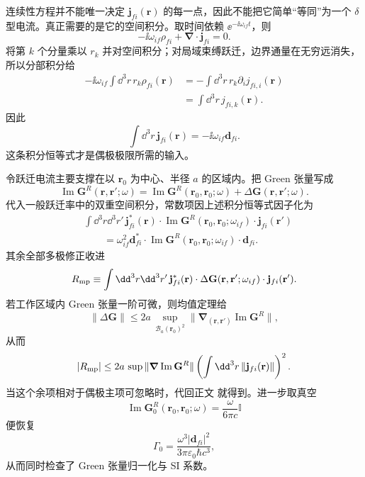 \begin{derivation}
连续性方程并不能唯一决定 $\mathbf j_{fi}(\mathbf r)$ 的每一点，因此不能把它简单“等同”为一个 $\delta$ 型电流。真正需要的是它的空间积分。取时间依赖 $\ee^{-\ii\omega_{if}t}$，则
\[
-\ii\omega_{if}\rho_{fi}
+\boldsymbol\nabla\cdot\mathbf j_{fi}=0.
\]
将第 $k$ 个分量乘以 $r_k$ 并对空间积分；对局域束缚跃迁，边界通量在无穷远消失，所以分部积分给
\begin{align*}
-\ii\omega_{if}
\int\dd^3r\,r_k\rho_{fi}(\mathbf r)
&=-\int\dd^3r\,r_k\partial_i j_{fi,i}(\mathbf r)\\
&=\int\dd^3r\,j_{fi,k}(\mathbf r).
\end{align*}
因此
\[
\boxed{
\int\dd^3r\,\mathbf j_{fi}(\mathbf r)
=-\ii\omega_{if}\mathbf d_{fi}.}
\]
这条积分恒等式才是偶极极限所需的输入。

令跃迁电流主要支撑在以 $\mathbf r_0$ 为中心、半径 $a$ 的区域内。把 Green 张量写成
\[
\operatorname{Im}\mathbf G^R(\mathbf r,\mathbf r';\omega)
=\operatorname{Im}\mathbf G^R(\mathbf r_0,\mathbf r_0;\omega)
+\Delta\mathbf G(\mathbf r,\mathbf r';\omega).
\]
代入一般跃迁率中的双重空间积分，常数项因上述积分恒等式因子化为
\begin{align*}
&\int\dd^3r\dd^3r'\,
\mathbf j_{fi}^*(\mathbf r)\cdot
\operatorname{Im}\mathbf G^R(\mathbf r_0,\mathbf r_0;\omega_{if})
\cdot\mathbf j_{fi}(\mathbf r')\\
&\qquad=\omega_{if}^2
\mathbf d_{fi}^*\cdot
\operatorname{Im}\mathbf G^R(\mathbf r_0,\mathbf r_0;\omega_{if})
\cdot\mathbf d_{fi}.
\end{align*}
其余全部多极修正收进
\[
R_{\rm mp}
\equiv
\int\dd^3r\dd^3r'\,
\mathbf j_{fi}^*(\mathbf r)\cdot
\Delta\mathbf G(\mathbf r,\mathbf r';\omega_{if})
\cdot\mathbf j_{fi}(\mathbf r').
\]
若工作区域内 Green 张量一阶可微，则均值定理给
\[
\|\Delta\mathbf G\|
\le
2a\,
\sup_{\mathcal B_a(\mathbf r_0)^2}
\|\boldsymbol\nabla_{(\mathbf r,\mathbf r')}\operatorname{Im}\mathbf G^R\|,
\]
从而
\[
|R_{\rm mp}|
\le
2a\,
\sup\|\boldsymbol\nabla\operatorname{Im}\mathbf G^R\|
\left(\int\dd^3r\,\|\mathbf j_{fi}(\mathbf r)\|\right)^2.
\]
当这个余项相对于偶极主项可忽略时，代回正文 就得到。进一步取真空
\[
\operatorname{Im}\mathbf G_0^R(\mathbf r_0,\mathbf r_0;\omega)
=\frac{\omega}{6\pi c}\mathbb I
\]
便恢复
\[
\Gamma_0
=\frac{\omega^3|\mathbf d_{fi}|^2}{3\pi\varepsilon_0\hbar c^3},
\]
从而同时检查了 Green 张量归一化与 SI 系数。
\end{derivation}

